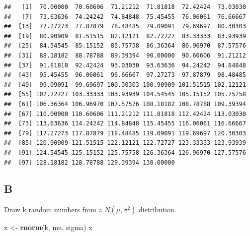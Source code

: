 \documentclass[
]{article}
\newenvironment{Shaded}{\begin{snugshade}}{\end{snugshade}}
\newcommand{\KeywordTok}[1]{\textcolor[rgb]{0.13,0.29,0.53}{\textbf{#1}}}
\newcommand{\NormalTok}[1]{#1}
\newcommand{\StringTok}[1]{\textcolor[rgb]{0.31,0.60,0.02}{#1}}
\begin{document}
\begin{verbatim}
##   [1]  70.00000  70.60606  71.21212  71.81818  72.42424  73.03030
##   [7]  73.63636  74.24242  74.84848  75.45455  76.06061  76.66667
##  [13]  77.27273  77.87879  78.48485  79.09091  79.69697  80.30303
##  [19]  80.90909  81.51515  82.12121  82.72727  83.33333  83.93939
##  [25]  84.54545  85.15152  85.75758  86.36364  86.96970  87.57576
##  [31]  88.18182  88.78788  89.39394  90.00000  90.60606  91.21212
##  [37]  91.81818  92.42424  93.03030  93.63636  94.24242  94.84848
##  [43]  95.45455  96.06061  96.66667  97.27273  97.87879  98.48485
##  [49]  99.09091  99.69697 100.30303 100.90909 101.51515 102.12121
##  [55] 102.72727 103.33333 103.93939 104.54545 105.15152 105.75758
##  [61] 106.36364 106.96970 107.57576 108.18182 108.78788 109.39394
##  [67] 110.00000 110.60606 111.21212 111.81818 112.42424 113.03030
##  [73] 113.63636 114.24242 114.84848 115.45455 116.06061 116.66667
##  [79] 117.27273 117.87879 118.48485 119.09091 119.69697 120.30303
##  [85] 120.90909 121.51515 122.12121 122.72727 123.33333 123.93939
##  [91] 124.54545 125.15152 125.75758 126.36364 126.96970 127.57576
##  [97] 128.18182 128.78788 129.39394 130.00000
\end{verbatim}

\hypertarget{b-2}{%
\subsection{B}\label{b-2}}

Draw k random numbers from a \(N(\mu, \sigma^2)\) distribution.

\begin{Shaded}
\begin{Highlighting}[]
\NormalTok{x \textless{}{-}}\StringTok{ }\KeywordTok{rnorm}\NormalTok{(k, mu, sigma)}
\NormalTok{x}
\end{Highlighting}
\end{Shaded}
\end{document}
